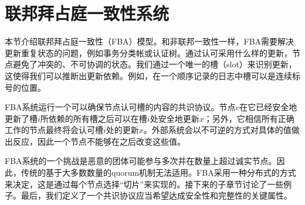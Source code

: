 \section{联邦拜占庭一致性系统}

本节介绍联邦拜占庭一致性（FBA）模型。和非联邦一致性一样，FBA需要解决更新重复状态的问题，例如事务分类帐或认证树。通过认可采用什么样的更新，节点避免了冲突的、不可协调的状态。我们通过一个唯一的槽（slot）来识别更新，这使得我们可以推断出更新依赖。例如，在一个顺序记录的日志中槽可以是连续标号的位置。

FBA系统运行一个可以确保节点认可槽的内容的共识协议。节点$v$在它已经安全地更新了槽$i$所依赖的所有槽之后可以在槽$i$处安全地更新$x$；另外，它相信所有正确工作的节点最终将会认可槽$i$处的更新$x$。外部系统会以不可逆的方式对具体的值做出反应，因此一个节点不能够在之后改变这些值。

FBA系统的一个挑战是恶意的团体可能参与多次并在数量上超过诚实节点。因此，传统的基于大多数数量的quorum机制无法适用。FBA采用一种分布式的方式来决定{\quorum}，这是通过每个节点选择``{\quorum}切片''来实现的。接下来的子章节讨论了一些例子。最后，我们定义了一个共识协议应当希望达成安全性和完整性的关键属性。



